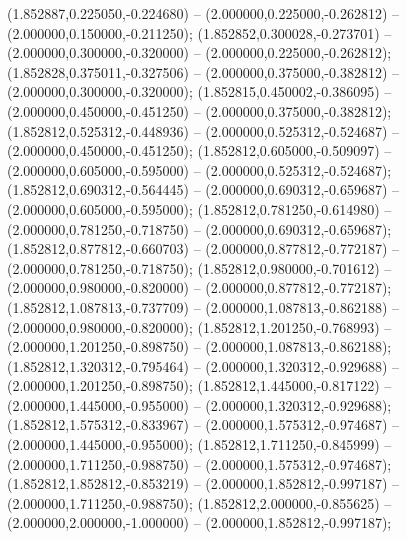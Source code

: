  (1.852887,0.225050,-0.224680) -- (2.000000,0.225000,-0.262812) -- (2.000000,0.150000,-0.211250);
 (1.852852,0.300028,-0.273701) -- (2.000000,0.300000,-0.320000) -- (2.000000,0.225000,-0.262812);
 (1.852828,0.375011,-0.327506) -- (2.000000,0.375000,-0.382812) -- (2.000000,0.300000,-0.320000);
 (1.852815,0.450002,-0.386095) -- (2.000000,0.450000,-0.451250) -- (2.000000,0.375000,-0.382812);
 (1.852812,0.525312,-0.448936) -- (2.000000,0.525312,-0.524687) -- (2.000000,0.450000,-0.451250);
 (1.852812,0.605000,-0.509097) -- (2.000000,0.605000,-0.595000) -- (2.000000,0.525312,-0.524687);
 (1.852812,0.690312,-0.564445) -- (2.000000,0.690312,-0.659687) -- (2.000000,0.605000,-0.595000);
 (1.852812,0.781250,-0.614980) -- (2.000000,0.781250,-0.718750) -- (2.000000,0.690312,-0.659687);
 (1.852812,0.877812,-0.660703) -- (2.000000,0.877812,-0.772187) -- (2.000000,0.781250,-0.718750);
 (1.852812,0.980000,-0.701612) -- (2.000000,0.980000,-0.820000) -- (2.000000,0.877812,-0.772187);
 (1.852812,1.087813,-0.737709) -- (2.000000,1.087813,-0.862188) -- (2.000000,0.980000,-0.820000);
 (1.852812,1.201250,-0.768993) -- (2.000000,1.201250,-0.898750) -- (2.000000,1.087813,-0.862188);
 (1.852812,1.320312,-0.795464) -- (2.000000,1.320312,-0.929688) -- (2.000000,1.201250,-0.898750);
 (1.852812,1.445000,-0.817122) -- (2.000000,1.445000,-0.955000) -- (2.000000,1.320312,-0.929688);
 (1.852812,1.575312,-0.833967) -- (2.000000,1.575312,-0.974687) -- (2.000000,1.445000,-0.955000);
 (1.852812,1.711250,-0.845999) -- (2.000000,1.711250,-0.988750) -- (2.000000,1.575312,-0.974687);
 (1.852812,1.852812,-0.853219) -- (2.000000,1.852812,-0.997187) -- (2.000000,1.711250,-0.988750);
 (1.852812,2.000000,-0.855625) -- (2.000000,2.000000,-1.000000) -- (2.000000,1.852812,-0.997187);
